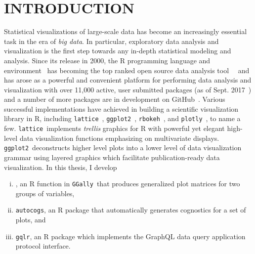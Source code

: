 \documentclass[stat,dissertation]{puthesis}\usepackage[]{graphicx}\usepackage{xcolor}
\newcommand{\pkg}[1]{\texttt{#1}}
\newcommand{\ggplot}{\pkg{ggplot2}}
\newcommand{\trelliscopejs}{\pkg{trelliscopejs}}
\newcommand{\autocogs}{\pkg{autocogs}}
\newcommand{\gqlr}{\pkg{gqlr}}
\newcommand{\GGally}{\pkg{GGally}}
\begin{document}
%
%


\chapter{INTRODUCTION}

Statistical visualizations of large-scale data has become an increasingly essential task in the era of \emph{big data}.
In particular, exploratory data analysis and visualization is the first step towards any in-depth statistical modeling and analysis.
Since its release in 2000, the R programming language and environment~\cite{r_project} has becoming the top ranked open source data analysis tool~\cite{r4stats_popularity}~\cite{ieee_top_programming} and has arose as a powerful and convenient platform for performing data analysis and visualization with over 11,000 active, user submitted packages (as of Sept. 2017~\cite{r_packages}) and a number of more packages are in development on GitHub~\cite{github}.
Various successful implementations have achieved in building a scientific visualization library in R, including \pkg{lattice}~\cite{r_lattice}, \ggplot~\cite{r_ggplot2}, \pkg{rbokeh}~\cite{r_bokeh}, and \pkg{plotly}~\cite{r_plotly}, to name a few.
\pkg{lattice}~implements \emph{trellis} graphics for R with powerful yet elegant high-level data visualization functions emphasizing on multivariate displays.
\ggplot~deconstructs higher level plots into a lower level of data visualization grammar using layered graphics which facilitate publication-ready data visualization.
In this thesis, I develop
\begin{enumerate}[i)]
  \item {}, an R function in \GGally~that produces generalized plot matrices for two groups of variables,
  \item \autocogs, an R package that automatically generates cognostics for a set of plots, and
  \item \gqlr, an R package which implements the GraphQL data query application protocol interface.
\end{enumerate}

\end{document}
